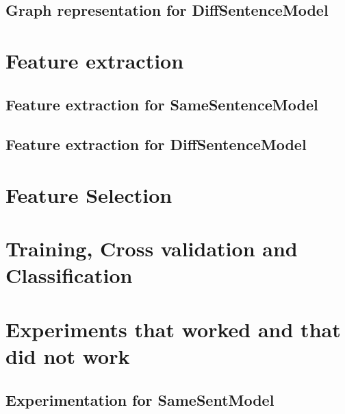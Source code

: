 \subsection{Graph representation for DiffSentenceModel}

\section{Feature extraction}

\subsection{Feature extraction for SameSentenceModel}

\subsection{Feature extraction for DiffSentenceModel}

\section{Feature Selection}

%
%
%

\section{Training, Cross validation and Classification}

\section{Experiments that worked and that did not work}

\subsection{Experimentation for SameSentModel}

